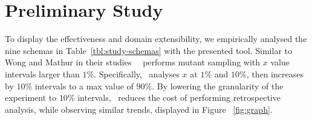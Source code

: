 \section{Preliminary Study}




To display the effectiveness and domain extensibility, we empirically analysed the nine schemas in Table~\ref{tbl:study-schemas}
with the presented tool.
Similar to Wong and Mathur in their studies~\cite{mathur1994empirical, wong1993mutation} \mr~performs mutant sampling with $x$ value intervals
larger than $1\%$.  Specifically, \mr~analyses $x$ at $1\%$ and  $10\%$, then increases by $10\%$ intervals to a max value of $90\%$.
By lowering the granularity of the experiment to $10\%$ intervals, \mr~reduces the cost of performing retrospective analysis, while observing
similar trends, displayed in Figure ~\ref{fig:graph}.







